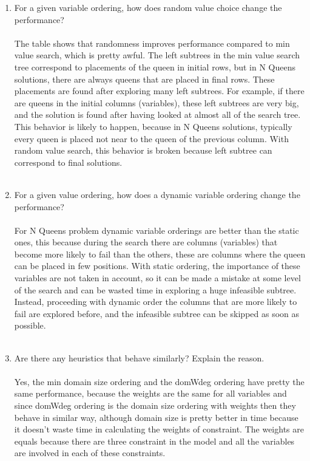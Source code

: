 \documentclass{article}
\begin{document}
    \begin{enumerate}
    \item For a given variable ordering, how does random value choice change the performance? \\ \\
    The table shows that randomness improves performance compared to min value search, which is pretty awful. The left subtrees in the min value search tree correspond to placements of the queen in initial rows, but in N Queens solutions, there are always queens that are placed in final rows. These placements are found after exploring many left subtrees. For example, if there are queens in the initial columns (variables), these left subtrees are very big, and the solution is found after having looked at almost all of the search tree. This behavior is likely to happen, because in N Queens solutions, typically every queen is placed not near to the queen of the previous column. With random value search, this behavior is broken because left subtree can correspond to final solutions. \\ \\
    \item For a given value ordering, how does a dynamic variable ordering change the performance? \\ \\
    For N Queens problem dynamic variable orderings are better than the static ones, this because during the search there are columns (variables) that become more likely to fail than the others, these are columns where the queen can be placed in few positions. With static ordering, the importance of these variables are not taken in account, so it can be made a mistake at some level of the search and can be wasted time in exploring a huge infeasible subtree. Instead, proceeding with dynamic order the columns that are more likely to fail are explored before, and the infeasible subtree can be skipped as soon as possible. \\ \\
    \item Are there any heuristics that behave similarly? Explain the reason. \\ \\
Yes, the min domain size ordering and the domWdeg ordering have pretty the same performance, because the weights are the same for all variables and since domWdeg ordering is the domain size ordering with weights then they behave in similar way, although domain size is pretty better in time because it doesn’t waste time in calculating the weights of constraint. The weights are equals because there are three constraint in the model and all the variables are involved in each of these constraints.

    \end{enumerate}
\end{document}
